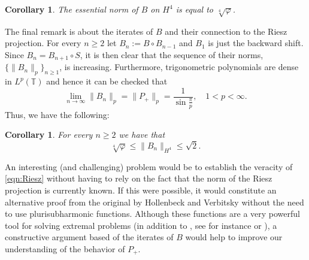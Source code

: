 \documentclass{amsart}
\theoremstyle{plain}
\newtheorem{coro}[theo]{Corollary}
\theoremstyle{definition}
\newcommand{\T}{\mathbb{T}}
\begin{document}
    	\begin{coro}
    		The essential norm of $B$ on $H^4$ is equal to $\sqrt[4]{\varphi}$.
    	\end{coro}
    	
    	The final remark is about the iterates of $B$ and their connection to the Riesz projection. For every $n \geq 2$ let $B_n := B \circ B_{n-1}$ and $B_1$ is just the backward shift. Since $B_n = B_{n+1} \circ S$, it is then clear that the sequence of their norms, $\{ \| B_n \|_{p} \}_{n \geq 1}$, is increasing. Furthermore, trigonometric polynomials are dense in $L^p ( \T)$ and hence it can be checked that
    	\begin{equation} \label{eqn:Riesz}
    		\lim_{n \to \infty} \| B_n \|_{p} = \| P_{+} \|_{p} = \dfrac{1}{\sin \frac{\pi}{p}}, \quad 1 < p < \infty.
    	\end{equation}
    	Thus, we have the following:
    	
    	\begin{coro}
    		For every $n \geq 2$ we have that
    		\[
    		\sqrt[4]{\varphi} \leq \| B_n \|_{H^4} \leq \sqrt{2}.
    		\]
    	\end{coro}
    	
    	An interesting (and challenging) problem would be to establish the veracity of \eqref{eqn:Riesz} without having to rely on the fact that the norm of the Riesz projection is currently known. If this were possible, it would constitute an alternative proof from the original by Hollenbeck and Verbitsky \cite{MR1780482} without the need to use plurisubharmonic functions. Although these functions are a very powerful tool for solving extremal problems (in addition to \cite{MR1780482}, see for instance \cite{MR4009386} or \cite{MR4721797}), a constructive argument based of the iterates of $B$ would help to improve our understanding of the behavior of $P_+$.
	
	
	
	
	
	
	
	
	
\end{document}
